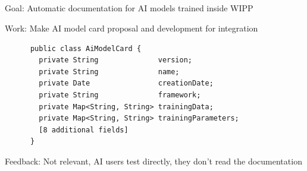 \subsection{\slidetitle}
\begin{frame}[containsverbatim]
  \frametitle{\sectiontitle}
  \framesubtitle{\slidetitle}

  Goal: Automatic documentation for AI models trained inside WIPP

  Work: Make AI model card proposal and development for integration

  \begin{listing}[H]
    \begin{verbatim}
      public class AiModelCard {
        private String              version;
        private String              name;
        private Date                creationDate;
        private String              framework;
        private Map<String, String> trainingData;
        private Map<String, String> trainingParameters;
        [8 additional fields]
      }
    \end{verbatim}
  \end{listing}

  Feedback: Not relevant, AI users test directly, they don't read the documentation

\end{frame}

